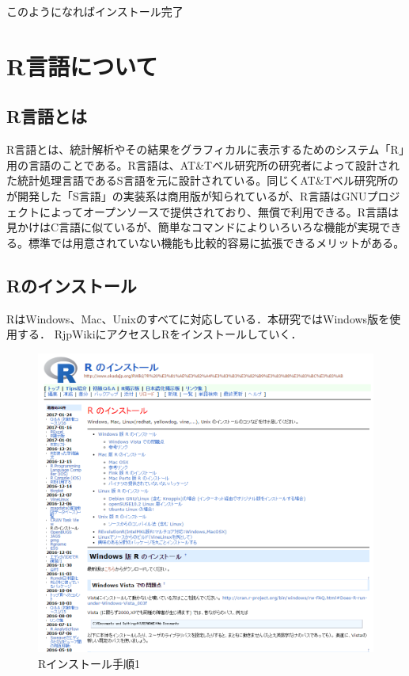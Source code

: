 このようになればインストール完了


\section{R言語について}
\subsection{R言語とは}
R言語とは、統計解析やその結果をグラフィカルに表示するためのシステム「R」用の言語のことである。R言語は、AT\&Tベル研究所の研究者によって設計された統計処理言語であるS言語を元に設計されている。同じくAT\&Tベル研究所のが開発した「S言語」の実装系は商用版が知られているが、R言語はGNUプロジェクトによってオープンソースで提供されており、無償で利用できる。R言語は見かけはC言語に似ているが、簡単なコマンドによりいろいろな機能が実現できる。標準では用意されていない機能も比較的容易に拡張できるメリットがある。

\newpage

\subsection{Rのインストール}
RはWindows、Mac、Unixのすべてに対応している．本研究ではWindows版を使用する．
RjpWiki\cite{Rｊｐ}にアクセスしRをインストールしていく．

\begin{figure}[H]
\centering
\includegraphics[width=12cm]{R1.PNG}
\caption{Rインストール手順1}\label{サンプル図}
\end{figure}

